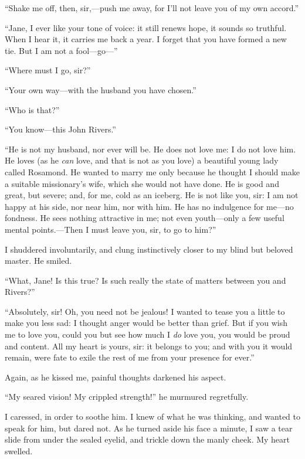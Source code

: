 \enquote{Shake me off, then, sir,---push me away, for I'll not leave you
	of my own accord.}

\enquote{Jane, I ever like your tone of voice: it still renews hope, it
	sounds so truthful. When I hear it, it carries me back a year. I
	forget that you have formed a new tie. But I am not a fool---go---}

\enquote{Where must I go, sir?}

\enquote{Your own way---with the husband you have chosen.}

\enquote{Who is that?}

\enquote{You know---this \St{} John Rivers.}

\enquote{He is not my husband, nor ever will be. He does not love me: I do not
	love him. He loves (as he \emph{can} love, and that is not as you love)
	a beautiful young lady called Rosamond. He wanted to marry me only
	because he thought I should make a suitable missionary's wife, which she
	would not have done. He is good and great, but severe; and, for me,
	cold as an iceberg. He is not like you, sir: I am not happy at his
	side, nor near him, nor with him. He has no indulgence for me---no
	fondness. He sees nothing attractive in me; not even youth---only a few
	useful mental points.---Then I must leave you, sir, to go to him?}

I shuddered involuntarily, and clung instinctively closer to my blind
but beloved master. He smiled.

\enquote{What, Jane! Is this true? Is such really the state of matters
	between you and Rivers?}

\enquote{Absolutely, sir! Oh, you need not be jealous! I wanted to tease you
	a little to make you less sad: I thought anger would be better than
	grief. But if you wish me to love you, could you but see how much I
	\emph{do} love you, you would be proud and content. All my heart is
	yours, sir: it belongs to you; and with you it would remain, were fate
	to exile the rest of me from your presence for ever.}

Again, as he kissed me, painful thoughts darkened his aspect.

\enquote{My seared vision! My crippled strength!} he murmured
regretfully.

I caressed, in order to soothe him. I knew of what he was thinking, and
wanted to speak for him, but dared not. As he turned aside his face a
minute, I saw a tear slide from under the sealed eyelid, and trickle
down the manly cheek. My heart swelled.

